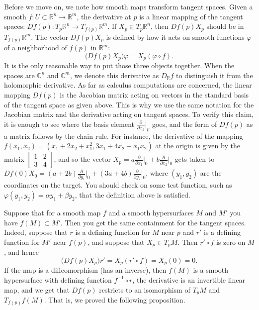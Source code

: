 \documentclass[12pt,openany]{book}
\newcommand{\C}{{\mathbb{C}}}
\newcommand{\R}{{\mathbb{R}}}
\theoremstyle{plain}
\theoremstyle{remark}
\theoremstyle{definition}
\theoremstyle{exercise}
\theoremstyle{example}
\begin{document}
Before we move on, we note how smooth maps transform tangent spaces.
Given a smooth
$f \colon U \subset \R^n \to \R^m$,
the derivative at $p$ is a linear mapping of
the tangent spaces: $Df(p) \colon T_p \R^n \to T_{f(p)} \R^m$.
If $X_p \in T_p \R^n$, then
$Df(p) X_p$ should be in $T_{f(p)} \R^m$.
The vector
$Df(p) X_p$ is defined by how it acts on
smooth functions $\varphi$ of a neighborhood
of $f(p)$ in $\R^m$:
%
\begin{equation*}
\bigl( Df(p) X_p \bigr) \varphi = X_p (\varphi \circ f) .
\end{equation*}
It is the only reasonable way to put those three objects together.
When the spaces are $\C^n$ and $\C^m$, we denote this
derivative as
%
$D_\R f$
to distinguish it from the holomorphic derivative.
As far as calculus computations are concerned,
the linear mapping $Df(p)$ is
the Jacobian matrix acting on vectors in the standard basis of the tangent space
as given above.
This is why we use the same notation for the Jacobian
matrix and the derivative acting on tangent spaces.
To verify this claim, it is enough to see where the basis element
$\frac{\partial}{\partial x_k}\big|_p$ goes, and the form of $Df(p)$
as a matrix
follows by the chain rule.
For instance, the derivative of the mapping $f(x_1,x_2) =
(x_1+2x_2+x_1^2,3x_1+4x_2+x_1x_2)$ at the origin is given by the matrix
$\left[ \begin{smallmatrix} 1 & 2 \\ 3 & 4 \end{smallmatrix} \right]$,
and so the vector
$X_p = a\frac{\partial}{\partial x_1}\big|_0
+
b\frac{\partial}{\partial x_2}\big|_0$
gets taken to
$Df(0) X_0 = (a+2b)\frac{\partial}{\partial y_1}\big|_0
+
(3a+4b)\frac{\partial}{\partial y_2}\big|_0$, where $(y_1,y_2)$ are the
coordinates on the target.  You should check on some test
function, such as
$\varphi(y_1,y_2) = \alpha y_1 + \beta y_2$, that the definition above is
satisfied.

Suppose that for a smooth map $f$ and a smooth hypersurfaces $M$ and $M'$
you have $f(M) \subset M'$.  Then you get the same containment for the
tangent spaces.  Indeed, suppose that $r$ is a defining function for $M$
near $p$ and $r'$ is a defining function for $M'$ near $f(p)$, and
suppose that $X_p \in T_p M$.  Then $r' \circ f$ is zero on $M$,
and hence
\begin{equation*}
\bigl( Df(p) X_p \bigr) r' = X_p (r' \circ f) = X_p (0) = 0 .
\end{equation*}
If the map is a diffeomorphism (has an inverse), then $f(M)$ is a smooth
hypersurface with defining function $f^{-1} \circ r$, the derivative is
an invertible linear map, and we get that $Df(p)$ restricts to an
isomorphism of $T_pM$ and $T_{f(p)} f(M)$.  That is, we proved the following
proposition.
\end{document}
